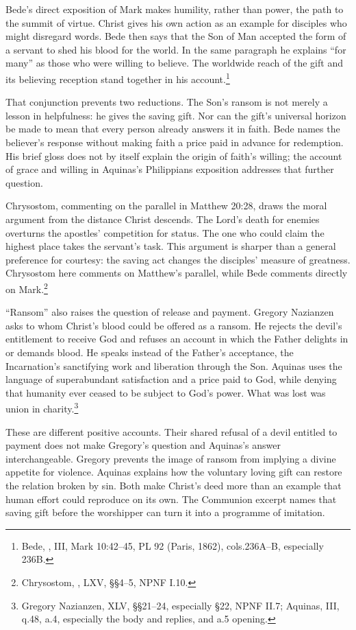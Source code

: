 Bede's direct exposition of Mark makes humility, rather than power, the path to the summit of virtue. Christ gives his own action as an example for disciples who might disregard words. Bede then says that the Son of Man accepted the form of a servant to shed his blood for the world. In the same paragraph he explains ``for many'' as those who were willing to believe. The worldwide reach of the gift and its believing reception stand together in his account.\footnote{Bede, , III, Mark 10:42--45, PL 92 (Paris, 1862), cols.236A--B, especially 236B.}

That conjunction prevents two reductions. The Son's ransom is not merely a lesson in helpfulness: he gives the saving gift. Nor can the gift's universal horizon be made to mean that every person already answers it in faith. Bede names the believer's response without making faith a price paid in advance for redemption. His brief gloss does not by itself explain the origin of faith's willing; the account of grace and willing in Aquinas's Philippians exposition addresses that further question.

Chrysostom, commenting on the parallel in Matthew 20:28, draws the moral argument from the distance Christ descends. The Lord's death for enemies overturns the apostles' competition for status. The one who could claim the highest place takes the servant's task. This argument is sharper than a general preference for courtesy: the saving act changes the disciples' measure of greatness. Chrysostom here comments on Matthew's parallel, while Bede comments directly on Mark.\footnote{Chrysostom, , LXV, §§4--5, NPNF I.10.}

``Ransom'' also raises the question of release and payment. Gregory Nazianzen asks to whom Christ's blood could be offered as a ransom. He rejects the devil's entitlement to receive God and refuses an account in which the Father delights in or demands blood. He speaks instead of the Father's acceptance, the Incarnation's sanctifying work and liberation through the Son. Aquinas uses the language of superabundant satisfaction and a price paid to God, while denying that humanity ever ceased to be subject to God's power. What was lost was union in charity.\footnote{Gregory Nazianzen,  XLV, §§21--24, especially §22, NPNF II.7; Aquinas,  III, q.48, a.4, especially the body and replies, and a.5 opening.}

These are different positive accounts. Their shared refusal of a devil entitled to payment does not make Gregory's question and Aquinas's answer interchangeable. Gregory prevents the image of ransom from implying a divine appetite for violence. Aquinas explains how the voluntary loving gift can restore the relation broken by sin. Both make Christ's deed more than an example that human effort could reproduce on its own. The Communion excerpt names that saving gift before the worshipper can turn it into a programme of imitation.

